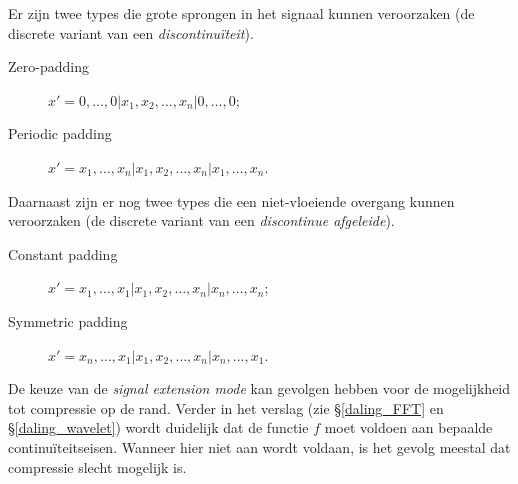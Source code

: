 Er zijn twee types die grote sprongen in het signaal kunnen veroorzaken (de discrete variant van een \emph{discontinu\"iteit}).
\begin{description}
\item[Zero-padding] $x' = 0, \ldots, 0| x_1, x_2, \ldots, x_n| 0, \ldots, 0$;
\item[Periodic padding] $x' = x_1, \ldots, x_n| x_1, x_2, \ldots, x_n| x_1, \ldots, x_n$.
\end{description}
Daarnaast zijn er nog twee types die een niet-vloeiende overgang kunnen veroorzaken (de discrete variant van een \emph{discontinue afgeleide}).
\begin{description}
\item[Constant padding] $x' = x_1, \ldots, x_1| x_1, x_2, \ldots, x_n| x_n, \ldots, x_n$;
\item[Symmetric padding] $x' = x_n, \ldots, x_1| x_1, x_2, \ldots, x_n| x_n, \ldots, x_1$.
\end{description}

De keuze van de \emph{signal extension mode} kan gevolgen hebben voor de mogelijkheid tot compressie op de rand. Verder in het verslag (zie \S \ref{daling_FFT} en \S \ref{daling_wavelet}) wordt duidelijk dat de functie $f$ moet voldoen aan bepaalde continu\"iteitseisen. Wanneer hier niet aan wordt voldaan, is het gevolg meestal dat compressie slecht mogelijk is.

